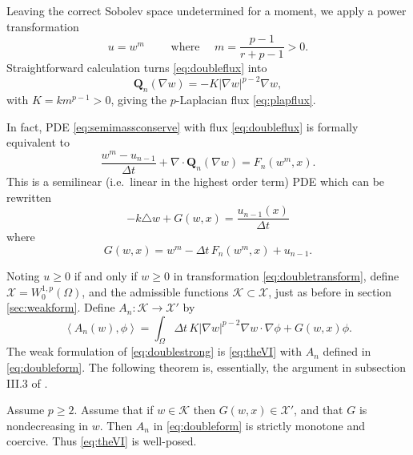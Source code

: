 \documentclass[final,leqno,onefignum,onetabnum]{siamltex1213bueler}
\newcommand\bQ{\mathbf{Q}}
\newcommand{\Div}{\nabla\cdot}
\renewcommand{\grad}{\nabla}
\newcommand{\ip}[2]{\ensuremath{\left<#1,#2\right>}}
\newcommand\lap{\triangle}
\begin{document}
Leaving the correct Sobolev space undetermined for a moment, we apply a power transformation
\begin{equation}
	u = w^m \qquad \text{ where } \quad m = \frac{p-1}{r+p-1} > 0. \label{eq:doubletransform}
\end{equation}
Straightforward calculation turns \eqref{eq:doubleflux} into
\begin{equation}
	\bQ_n(\grad w) = - K |\grad w|^{p-2} \grad w, \label{eq:doublenewflux}
\end{equation}
with $K=k m^{p-1}>0$, giving the $p$-Laplacian flux \eqref{eq:plapflux}.

In fact, PDE \eqref{eq:semimassconserve} with flux \eqref{eq:doubleflux} is formally equivalent to
\begin{equation}
    \frac{w^m - u_{n-1}}{\Delta t} + \Div \bQ_n(\grad w) = F_n(w^m,x).  \label{eq:doublestrong}
\end{equation}
This is a semilinear (i.e.~linear in the highest order term) PDE which can be rewritten
\begin{equation}
    - k \lap w + G(w,x) = \frac{u_{n-1}(x)}{\Delta t} \label{eq:doublesemilinear}
\end{equation}
where
\begin{equation}
   G(w,x) = w^m - \Delta t\, F_n(w^m,x) + u_{n-1}. \label{eq:doubleGdefn}
\end{equation}

Noting $u\ge 0$ if and only if $w\ge 0$ in transformation \eqref{eq:doubletransform}, define $\mathcal{X} = W_0^{1,p}(\Omega)$, and the admissible functions $\mathcal{K}\subset \mathcal{X}$, just as before in section \ref{sec:weakform}.  Define $A_n: \mathcal{K} \to \mathcal{X}'$ by
\begin{equation}
\ip{A_n(w)}{\phi} = \int_\Omega \Delta t\, K |\grad w|^{p-2} \grad w\cdot \grad \phi + G(w,x)\phi. \label{eq:doubleform}
\end{equation}
The weak formulation of \eqref{eq:doublestrong} is \eqref{eq:theVI} with $A_n$ defined in \eqref{eq:doubleform}.  The following theorem is, essentially, the argument in subsection III.3 of \cite{KinderlehrerStampacchia}.

\begin{theorem}
Assume $p\ge 2$.  Assume that if $w\in\mathcal{K}$ then $G(w,x)\in \mathcal{X}'$, and that $G$ is nondecreasing in $w$.  Then $A_n$ in \eqref{eq:doubleform} is strictly monotone and coercive.  Thus \eqref{eq:theVI} is well-posed.
\end{theorem}
\end{document}
